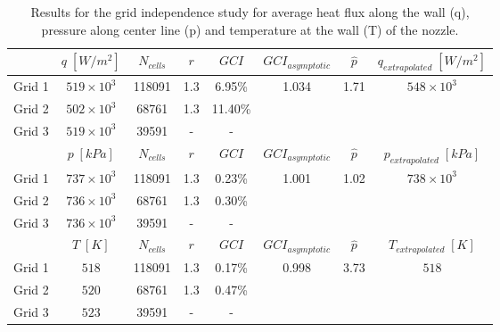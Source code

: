 \documentclass[10pt,fleqn,a4paper,twoside]{article}
\begin{document}
\begin{table}
	\caption{Results for the grid independence study for average heat flux along the wall (q), pressure along center line (p) and temperature at the wall (T) of the nozzle.}
 \label{tab:gci}
	\begin{center}
		\begin{tabular}{@{}l|c|c|c|c|c|c|c@{}}
			\hline
& $ q \;[W/m^2] $ & $ N_{cells} $ & $ r $ & $ GCI $ & $ GCI_{asymptotic} $ & $ \hat{p} $ & $ q_{extrapolated} \;[W/m^2]$ \\ 
\hline%
Grid 1 & $519 \times 10^3$ & 118091 & 1.3 & 6.95\%   & \multirow{3}{*}{ 1.034 } & \multirow{3}{*}{ 1.71 } & \multirow{3}{*}{ $548 \times 10^3$ } \\ 
Grid 2 & $502 \times 10^3$ & 68761  & 1.3 & 11.40\% &                       &                      &                       \\ 
Grid 3 & $519 \times 10^3$ & 39591  & -   & -     &                       &                      &                       \\
\hline%

& $ p \;[kPa] $ & $ N_{cells} $ & $ r $ & $ GCI $ & $ GCI_{asymptotic} $ & $ \hat{p} $ & $ p_{extrapolated} \;[kPa]$ \\
\hline%
Grid 1 & $737 \times 10^3$ & 118091 & 1.3 & 0.23\%   & \multirow{3}{*}{ 1.001 } & \multirow{3}{*}{ 1.02 } & \multirow{3}{*}{ $738  \times 10^3$ } \\ 
Grid 2 & $736 \times 10^3$ & 68761  & 1.3 & 0.30\% &                       &                      &                       \\ 
Grid 3 & $736 \times 10^3$ & 39591  & -   & -     &                       &                      &                       \\
\hline%

 & $ T \;[K] $ & $ N_{cells} $ & $ r $ & $ GCI $ & $ GCI_{asymptotic} $ & $ \hat{p} $ & $ T_{extrapolated}\;[K] $ \\
\hline%
Grid 1 & $518$ & 118091 & 1.3 & 0.17\%   & \multirow{3}{*}{ 0.998 } & \multirow{3}{*}{ 3.73 } & \multirow{3}{*}{ $518$ } \\ 
Grid 2 & $520$ & 68761  & 1.3 & 0.47\% &                       &                      &                       \\ 
Grid 3 & $523$ & 39591  & -   & -     &                       &                      &                       \\
\hline%
		\end{tabular}
	\end{center}
\end{table}
\end{document}
